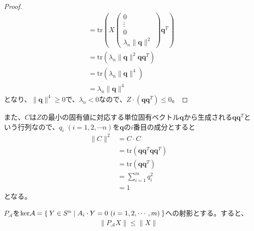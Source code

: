 \begin{proof}
\begin{align*}
                                                 & = \mathrm{tr}\left(X \left(\begin{array}{c} 0 \\ \vdots \\ 0 \\ \lambda_n \|\mathbf{q}\|^2 \end{array}\right) \mathbf{q}^T\right) \\
                                                 & = \mathrm{tr}\left(\lambda_n \|\mathbf{q}\|^2 \mathbf{q} \mathbf{q}^T\right) \\
                                                 & = \mathrm{tr}\left(\lambda_n \|\mathbf{q}\|^4\right) \\
                                                 & = \lambda_n \|\mathbf{q}\|^4
  \end{align*}
  となり、$\|\mathbf{q}\|^4 \geq 0$で、$\lambda_n < 0$なので、$Z \cdot \left(\mathbf{q} \mathbf{q}^T\right) \leq 0$。
\end{proof}
また、$C$は$Z$の最小の固有値に対応する単位固有ベクトル$\mathbf{q}$から生成される$\mathbf{q} \mathbf{q}^T$という行列なので、$q_i \,\, (i = 1, 2, \cdots n)$を$\mathbf{q}$の$i$番目の成分とすると
\begin{align*}
  \|C\|^2 & = C \cdot C \\
          & = \mathrm{tr} \left(\mathbf{q} \mathbf{q}^T \mathbf{q} \mathbf{q}^T\right) \\
          & = \mathrm{tr} \left(\mathbf{q} \mathbf{q}^T\right) \\
          & = \displaystyle{\sum_{i = 1}^m q_i^2} \\
          & = 1
\end{align*}
となる。
\begin{lemma} \label{Shrink}
  $P_\mathcal{A}$を$\mathrm{ker} \mathcal{A} = \Set{Y \in S^n | A_i \cdot Y = 0 \,\, (i = 1, 2, \cdots, m)}$への射影とする。すると、
  \begin{align*}
    \|P_\mathcal{A} X\| \leq \|X\|
  \end{align*}
\end{lemma}
